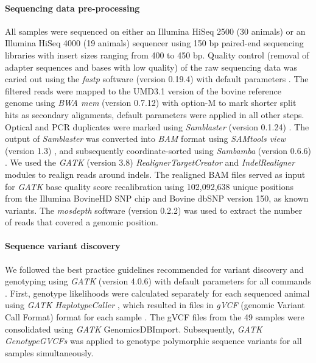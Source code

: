\documentclass[../main.tex]{subfiles}
\begin{document}
\paragraph{Sequencing data pre-processing}

All samples were sequenced on either an Illumina HiSeq 2500 (30 animals) or an Illumina HiSeq 4000 (19 animals) sequencer using 150 bp paired-end sequencing libraries with insert sizes ranging from 400 to 450 bp. Quality control (removal of adapter sequences and bases with low quality) of the raw sequencing data was caried out using the \emph{fastp} software (version 0.19.4) with default parameters \citep{chen2018fastp}. The filtered reads were mapped to the UMD3.1 version of the bovine reference genome \citep{zimin2009whole} using \emph{BWA mem} (version 0.7.12) \citep{li2009fast} with option-M to mark shorter split hits as secondary alignments, default parameters were applied in all other steps. Optical and PCR duplicates were marked using \emph{Samblaster} (version 0.1.24) \citep{faust2014samblaster}. The output of \emph{Samblaster} was converted into \emph{BAM} format using \emph{SAMtools view} (version 1.3) \citep{li2009sequence}, and subsequently coordinate-sorted using \emph{Sambamba} (version 0.6.6) \citep{tarasov2015sambamba}. We used the \emph{GATK} (version 3.8) \emph{RealignerTargetCreator} and \emph{IndelRealigner} modules to realign reads around indels. The realigned BAM files served as input for \emph{GATK} base quality score recalibration using 102,092,638 unique positions from the Illumina BovineHD SNP chip and Bovine dbSNP version 150, as known variants. The \emph{mosdepth} software (version 0.2.2) \citep{pedersen2018mosdepth} was used to extract the number of reads that covered a genomic position.

\paragraph{Sequence variant discovery}

We followed the best practice guidelines recommended for variant discovery and genotyping using \emph{GATK} (version 4.0.6) with default parameters for all commands \citep{mckenna2010genome,vander2018best,depristo2011framework}. First, genotype likelihoods were calculated separately for each sequenced animal using \emph{GATK HaplotypeCaller} \citep{vander2018best}, which resulted in files in \emph{gVCF} (genomic Variant Call Format) format for each sample \citep{danecek2011variant}. The gVCF files from the 49 samples were consolidated using \emph{GATK} GenomicsDBImport. Subsequently, \emph{GATK GenotypeGVCFs} was applied to genotype polymorphic sequence variants for all samples simultaneously.
\end{document}
